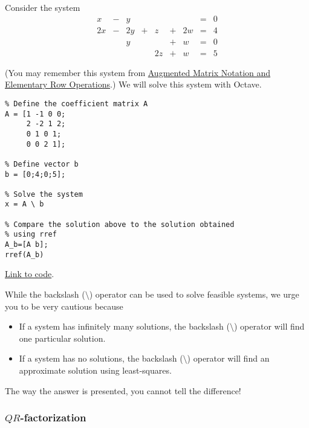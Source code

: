 \documentclass{ximera}
\begin{document}
\begin{example}\label{temp:systems1}
Consider the system
\begin{equation}
\begin{array}{ccccccccc}
      x &- &y&&&&&= &0 \\
	 2x& -&2y&+&z&+&2w&=&4\\
     & &y&&&+&w&=&0\\
     & &&&2z&+&w&=&5
    \end{array}
    \end{equation}

 (You may remember this system from \href{https://ximera.osu.edu/linearalgebrav3/LinearAlgebraInteractiveIntro/SYS-0020/main}{Augmented Matrix Notation and Elementary Row Operations}.)  We will solve this system with Octave.   
\begin{verbatim}
% Define the coefficient matrix A
A = [1 -1 0 0;
     2 -2 1 2;
     0 1 0 1;
     0 0 2 1];

% Define vector b
b = [0;4;0;5];

% Solve the system 
x = A \ b

% Compare the solution above to the solution obtained
% using rref
A_b=[A b];
rref(A_b)
\end{verbatim}

\href{https://sagecell.sagemath.org/?z=eJxVj8EOgjAQRO9N-g9zIdEDSUv0RDgQ_QOPaAzFok2ANaUQ_Hu7UWLc20zf7GwTHG3rBovwsGjItq1rnB0C-jp4t6CUokSBSiPVUFC5FODJkGbQyFatwM_6J1VE9CVqKZK1Y7ZNIA8jheGdKt_lKt-v0Im6-XPH-BqD7SHFErESZ04wcaD-WfsvQ90UHA2oDXGM_l0yoY6VN45Noxvu8N628TNXU1QlDJeys4nG9g1f4kXS&lang=octave&interacts=eJyLjgUAARUAuQ==}{Link to code}.

\end{example}

\begin{warning}
  While the backslash ($\setminus$) operator can be used to solve feasible systems, we urge you to be very cautious because
\begin{itemize}
  \item If a system has infinitely many solutions, the backslash ($\setminus$) operator will find one particular solution.
  \item If a system has no solutions, the backslash ($\setminus$) operator will find an approximate solution using least-squares.  
\end{itemize}
The way the answer is presented, you cannot tell the difference!
\end{warning}

\subsubsection*{$QR$-factorization}
\end{document}
